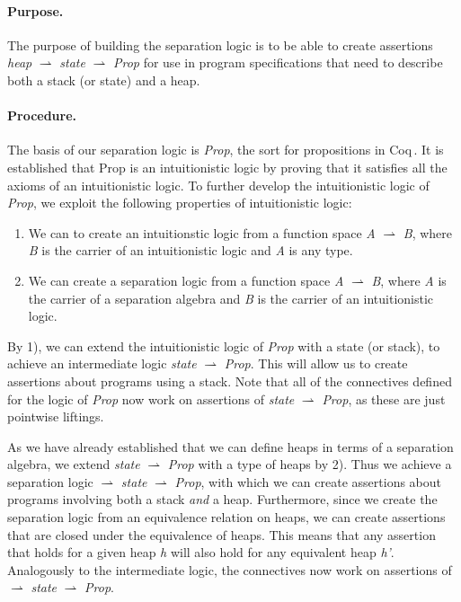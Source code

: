 \paragraph{Purpose.}
The purpose of building the separation logic is to be able to create assertions {\it heap} $\rightharpoonup$ {\it state} $\rightharpoonup$ {\it Prop} for use in program specifications that need to describe both a stack (or state) and a heap.

\paragraph{Procedure.} The basis of our separation logic is {\it Prop}, the sort for propositions in Coq\,\cite{CoqIntro}. 	It is established that Prop is an intuitionistic logic by proving that it satisfies all the axioms of an intuitionistic logic. To further develop the intuitionistic logic of {\it Prop}, we exploit the following properties of intuitionistic logic:

\begin{enumerate}[label=\arabic*)]
\item We can to create an intuitionstic logic from a function space {\it A} $\rightharpoonup$ {\it B}, where {\it B} is the carrier of an intuitionistic logic and {\it A} is any type.
\item We can create a separation logic from a function space {\it A} $\rightharpoonup$ {\it B}, where {\it A} is the carrier of a separation algebra and {\it B} is the carrier of an intuitionistic logic.\,\cite{JBSlides}
\end{enumerate} 

By 1), we can extend the intuitionistic logic of {\it Prop} with a state (or stack), to achieve an intermediate logic {\it state} $\rightharpoonup$ {\it Prop}. This will allow us to create assertions about programs using a stack. Note that all of the connectives defined for the logic of {\it Prop} now work on assertions of {\it state} $\rightharpoonup$ {\it Prop}, as these are just pointwise liftings.

As we have already established that we can define heaps in terms of a separation algebra, we extend {\it state} $\rightharpoonup$ {\it Prop} with a type of heaps by 2). Thus we achieve a separation logic \heap $\rightharpoonup$ {\it state} $\rightharpoonup$ {\it Prop}, with which we can create assertions about programs involving both a stack {\it and} a heap. Furthermore, since we create the separation logic from an equivalence relation on heaps, we can create assertions that are closed under the equivalence of heaps. This means that any assertion that holds for a given heap {\it h} will also hold for any equivalent heap {\it h'}. Analogously to the intermediate logic, the connectives now work on assertions of \heap $\rightharpoonup$ {\it state} $\rightharpoonup$ {\it Prop}.

